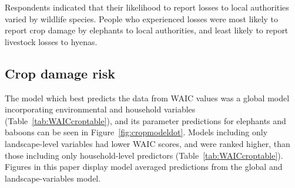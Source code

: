 \documentclass[12pt,]{article}
\begin{document}
\begin{table}[]
\label{tab:damagecharacteristics}
\end{table}

Respondents indicated that their likelihood to report losses to local authorities varied by wildlife species. People who experienced losses were most likely to report crop damage by elephants to local authorities, and least likely to report livestock losses to hyenas.


\subsection{Crop damage risk}
The model which best predicts the data from WAIC values was a global model incorporating environmental and household variables (Table~\ref{tab:WAICcroptable}), and its parameter predictions for elephants and baboons can be seen in Figure~\ref{fig:cropmodeldot}. Models including only landscape-level variables had lower WAIC scores, and were ranked higher, than those including only household-level predictors (Table~\ref{tab:WAICcroptable}). Figures in this paper display model averaged predictions from the global and landscape-variables model.

\end{document}
